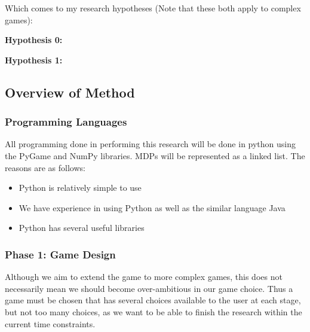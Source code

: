 \documentclass[11pt]{article}
\begin{document}
Which comes to my research hypotheses (Note that these both apply to complex games):

\vspace{6.0 mm}

\begin{flushleft}
\textbf{
Hypothesis 0:} 

\vspace{4.0 mm}

\textbf{
Hypothesis 1:} 
\end{flushleft}

\vspace{6.0 mm}

\subsection{Overview of Method}
\subsubsection{Programming Languages}
All programming done in performing this research will be done in python using the PyGame and NumPy libraries. MDPs will be represented as a linked list. The reasons are as follows:
\begin{itemize}
\item Python is relatively simple to use
\item We have experience in using Python as well as the similar language Java
\item Python has several useful libraries
\end{itemize}
\subsubsection{Phase 1: Game Design}
Although we aim to extend the game to more complex games, this does not necessarily mean we should become over-ambitious in our game choice. Thus a game must be chosen that has several choices available to the user at each stage, but not too many choices, as we want to be able to finish the research within the current time constraints.
\vspace{6.0 mm}
\end{document}
